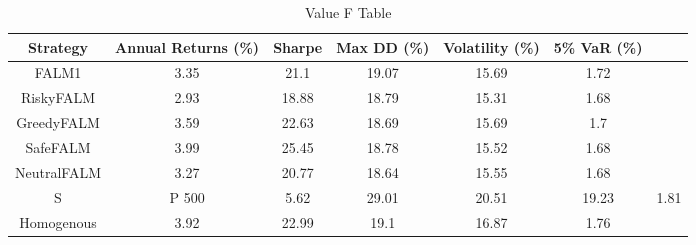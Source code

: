 \begin{table}[]
    \centering
    \caption{Value F Table}
    \begin{tabular}{|c|c|c|c|c|c|c|}
        \hline
        Strategy & Annual Returns (\%) & Sharpe & Max \ac{DD} (\%) & Volatility (\%)& 5\% \ac{VaR} (\%) \\
        \hline
        FALM1 & 3.35 & 21.1 & 19.07 & 15.69 & 1.72 \\
        RiskyFALM & 2.93 & 18.88 & 18.79 & 15.31 & 1.68 \\
        GreedyFALM & 3.59 & 22.63 & 18.69 & 15.69 & 1.7 \\
        SafeFALM & 3.99 & 25.45 & 18.78 & 15.52 & 1.68 \\
        NeutralFALM & 3.27 & 20.77 & 18.64 & 15.55 & 1.68 \\
        S&P 500 & 5.62 & 29.01 & 20.51 & 19.23 & 1.81 \\
        Homogenous & 3.92 & 22.99 & 19.1 & 16.87 & 1.76 \\
        \hline
    \end{tabular}
    \label{tab:value_f_table}
\end{table}

